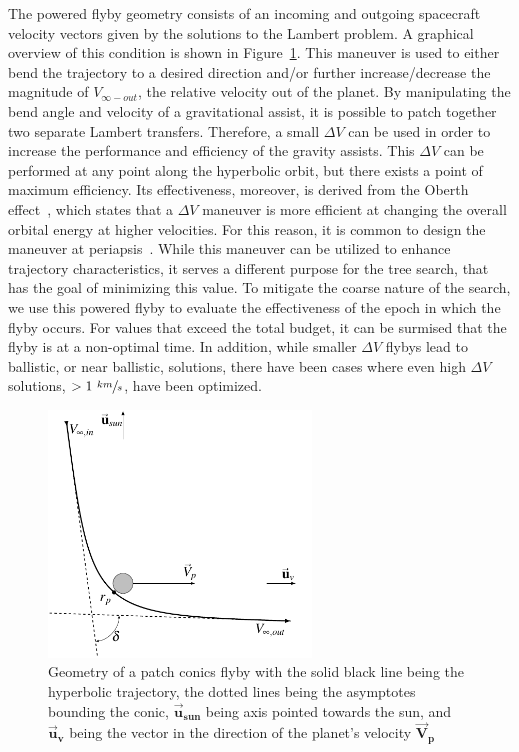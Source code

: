 \documentclass[letterpaper, paper,11pt]{AAS}	%
\begin{document}
The powered flyby geometry consists of an incoming and outgoing spacecraft velocity vectors given by the solutions to the Lambert problem. A graphical overview of this condition is shown in Figure~\ref*{fig:flyby}. This maneuver is used to either bend the trajectory to a desired direction and/or further increase/decrease the magnitude of $V_{\infty-out}$, the relative velocity out of the planet. By manipulating the bend angle and velocity of a gravitational assist, it is possible to patch together two separate Lambert transfers. Therefore, a small $\Delta V$ can be used in order to increase the performance and efficiency of the gravity assists. This $\Delta V$ can be performed at any point along the hyperbolic orbit, but there exists a point of maximum efficiency. Its effectiveness, moreover, is derived from the Oberth effect~\cite{Adams2010}, which states that a $\Delta V$ maneuver is more efficient at changing the overall orbital energy at higher velocities. For this reason, it is common to design the maneuver at periapsis~\cite{Brennan2015}. While this maneuver can be utilized to enhance trajectory characteristics, it serves a different purpose for the tree search, that has the goal of minimizing this value. To mitigate the coarse nature of the search, we use this powered flyby to evaluate the effectiveness of the epoch in which the flyby occurs. For values that exceed the total budget, it can be surmised that the flyby is at a non-optimal time. In addition, while smaller $\Delta V$ flybys lead to ballistic, or near ballistic, solutions, there have been cases where even high $\Delta V$ solutions, $> 1 \text{ } \sfrac{km}{s}$, have been optimized.

\begin{figure}[htb]
    \centering
    \includegraphics[width=2.75in]{fig/flybyGeo.png}
    \setlength{\belowcaptionskip}{-15pt}
    \caption{Geometry of a patch conics flyby with the solid black line being the hyperbolic trajectory, the dotted lines being the asymptotes bounding the conic, $\boldsymbol{\vec{u}_{sun}}$ being axis pointed towards the sun, and $\boldsymbol{\vec{u}_{v}}$ being the vector in the direction of the planet's velocity $\boldsymbol{\vec{V}_{p}}$}
    \label{fig:flyby}
\end{figure}
\end{document}
